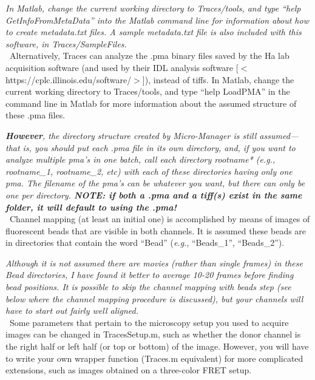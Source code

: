 \documentclass[11pt]{article}
\begin{document}
{\it In Matlab, change the current working directory to Traces/tools, and type ``help GetInfoFromMetaData'' into the Matlab command line for information about how to create metadata.txt files.  A sample metadata.txt file is also included with this software, in Traces/SampleFiles.}\\ 

\noindent \textbullet~Alternatively, Traces can analyze the .pma binary files saved by the Ha lab acquisition software (and used by their IDL analysis software [$<$https://cplc.illinois.edu/software/$>$]), instead of tiffs.  In Matlab, change the current working directory to Traces/tools, and type ``help LoadPMA'' in the command line in Matlab for more information about the assumed structure of these .pma files.  

{\it {\bf However}, the directory structure created by Micro-Manager is still assumed---that is, you should put each .pma file in its own directory, and, if you want to analyze multiple pma's in one batch, call each directory {\textit rootname*} ({\textit e.g.}, \textit{rootname\_1, rootname\_2, etc}) with each of these directories having only one pma.  The filename of the pma's can be whatever you want, but there can only be one per directory. {\bf NOTE: if both a .pma and a tiff(s) exist in the same folder, it will default to using the .pma!}} \\

\noindent \textbullet~Channel mapping (at least an initial one) is accomplished by means of images of fluorescent beads that are visible in both channels. It is assumed these beads are in directories that contain the word ``Bead'' ({\it e.g.}, ``Beads\_1'', ``Beads\_2'').

{\it Although it is not assumed there are movies (rather than single frames) in these Bead directories, I have found it better to average 10-20 frames before finding bead positions.  It is possible to skip the channel mapping with beads step (see below where the channel mapping procedure is discussed), but your channels will have to start out fairly well aligned.}\\

\noindent \textbullet~Some parameters that pertain to the microscopy setup you used to acquire images can be changed in TracesSetup.m, such as whether the donor channel is the right half or left half (or top or bottom) of the image. However, you will have to write your own wrapper function (Traces.m equivalent) for more complicated extensions, such as images obtained on a three-color FRET setup.
\end{document}
